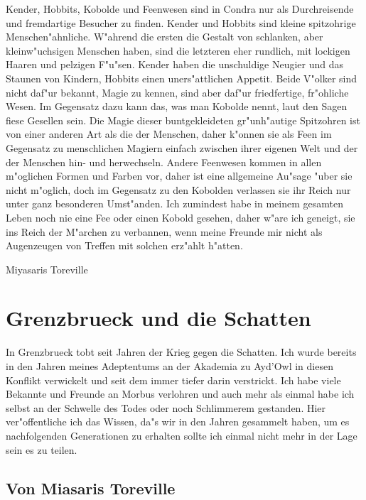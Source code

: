 \documentclass[a5paper,8pt]{book}
\begin{document}
Kender, Hobbits, Kobolde und Feenwesen sind in Condra nur als Durchreisende und fremdartige Besucher zu finden. Kender und Hobbits sind kleine spitzohrige Menschen"ahnliche. W"ahrend die ersten die Gestalt von schlanken, aber kleinw"uchsigen Menschen haben, sind die letzteren eher rundlich, mit lockigen Haaren und pelzigen F"u"sen. Kender haben die unschuldige Neugier und das Staunen von Kindern, Hobbits einen uners"attlichen Appetit. Beide V"olker sind nicht daf"ur bekannt, Magie zu kennen, sind aber daf"ur friedfertige, fr"ohliche Wesen. 
Im Gegensatz dazu kann das, was man Kobolde nennt, laut den Sagen fiese Gesellen sein. Die Magie dieser buntgekleideten gr"unh"autige Spitzohren ist von einer anderen Art als die der Menschen, daher k"onnen sie als Feen im Gegensatz zu menschlichen Magiern einfach zwischen ihrer eigenen Welt und der der Menschen hin- und herwechseln. Andere Feenwesen kommen in allen m"oglichen Formen und Farben vor, daher ist  eine allgemeine Au"sage "uber sie nicht m"oglich, doch im Gegensatz zu den Kobolden verlassen sie ihr Reich nur unter ganz besonderen Umst"anden. Ich zumindest habe in meinem gesamten Leben noch nie eine Fee oder einen Kobold gesehen, daher w"are ich geneigt, sie ins Reich der M"archen zu verbannen, wenn meine Freunde mir nicht als Augenzeugen von Treffen mit solchen erz"ahlt h"atten. 

\vspace{10mm}

Miyasaris Toreville

\newpage

\chapter{Grenzbrueck und die Schatten}

In Grenzbrueck tobt seit Jahren der Krieg gegen die Schatten. Ich wurde bereits in den Jahren meines Adeptentums an der Akademia zu Ayd'Owl in diesen Konflikt verwickelt und seit dem immer tiefer darin verstrickt. Ich habe viele Bekannte und Freunde an Morbus verlohren und auch mehr als einmal habe ich selbst an der Schwelle des Todes oder noch Schlimmerem gestanden. Hier ver"offentliche ich das Wissen, da"s wir in den Jahren gesammelt haben, um es nachfolgenden Generationen zu erhalten sollte ich einmal nicht mehr in der Lage sein es zu teilen.


\section{Von Miasaris Toreville}
\end{document}
